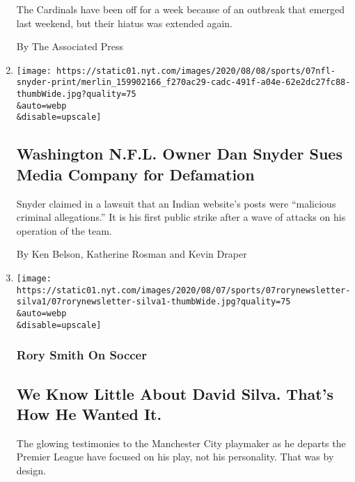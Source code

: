 \begin{enumerate}
  The Cardinals have been off for a week because of an outbreak that
  emerged last weekend, but their hiatus was extended again.

  By The Associated Press
\item
  \href{/2020/08/07/sports/dan-snyder-washington-nfl-defamation-lawsuit.html}{}

  \texttt{[image: https://static01.nyt.com/images/2020/08/08/sports/07nfl-snyder-print/merlin\_159902166\_f270ac29-cadc-491f-a04e-62e2dc27fc88-thumbWide.jpg?quality=75\\\&auto=webp\\\&disable=upscale]}

  \hypertarget{washington-nfl-owner-dan-snyder-sues-media-company-for-defamation}{%
  \subsection{Washington N.F.L. Owner Dan Snyder Sues Media Company for
  Defamation}\label{washington-nfl-owner-dan-snyder-sues-media-company-for-defamation}}

  Snyder claimed in a lawsuit that an Indian website's posts were
  ``malicious criminal allegations.'' It is his first public strike
  after a wave of attacks on his operation of the team.

  By Ken Belson, Katherine Rosman and Kevin Draper
\item
  \href{/2020/08/07/sports/soccer/david-silva-manchester-city.html}{}

  \texttt{[image: https://static01.nyt.com/images/2020/08/07/sports/07rorynewsletter-silva1/07rorynewsletter-silva1-thumbWide.jpg?quality=75\\\&auto=webp\\\&disable=upscale]}

  \hypertarget{rory-smith-on-soccer}{%
  \subsubsection{Rory Smith On Soccer}\label{rory-smith-on-soccer}}

  \hypertarget{we-know-little-about-david-silva-thats-how-he-wanted-it}{%
  \subsection{We Know Little About David Silva. That's How He Wanted
  It.}\label{we-know-little-about-david-silva-thats-how-he-wanted-it}}

  The glowing testimonies to the Manchester City playmaker as he departs
  the Premier League have focused on his play, not his personality. That
  was by design.


\end{enumerate}
